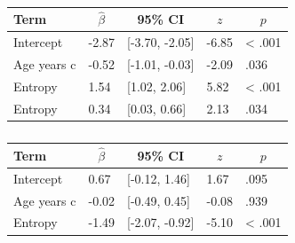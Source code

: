 \documentclass[
  english,
  ,man,floatsintext]{apa6}
\begin{document}
\begin{table}[tbp]

\begin{center}
\begin{threeparttable}

\caption{\label{tab:study2-accuracyswitchentropy}}

\begin{tabular}{lllll}
\toprule
Term & \multicolumn{1}{c}{$\hat{\beta}$} & \multicolumn{1}{c}{95\% CI} & \multicolumn{1}{c}{$z$} & \multicolumn{1}{c}{$p$}\\
\midrule
Intercept & -2.87 & [-3.70, -2.05] & -6.85 & < .001\\
Age years c & -0.52 & [-1.01, -0.03] & -2.09 & .036\\
Entropy & 1.54 & [1.02, 2.06] & 5.82 & < .001\\
Entropy & 0.34 & [0.03, 0.66] & 2.13 & .034\\
\bottomrule
\end{tabular}

\end{threeparttable}
\end{center}

\end{table}

\begin{table}[tbp]

\begin{center}
\begin{threeparttable}

\caption{\label{tab:study3-accuracyswitchentropy}}

\begin{tabular}{lllll}
\toprule
Term & \multicolumn{1}{c}{$\hat{\beta}$} & \multicolumn{1}{c}{95\% CI} & \multicolumn{1}{c}{$z$} & \multicolumn{1}{c}{$p$}\\
\midrule
Intercept & 0.67 & [-0.12, 1.46] & 1.67 & .095\\
Age years c & -0.02 & [-0.49, 0.45] & -0.08 & .939\\
Entropy & -1.49 & [-2.07, -0.92] & -5.10 & < .001\\
\bottomrule
\end{tabular}

\end{threeparttable}
\end{center}

\end{table}
\end{document}
